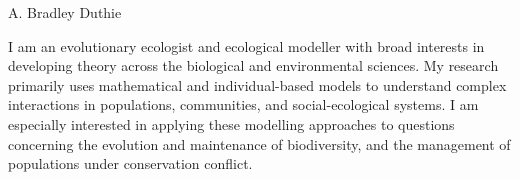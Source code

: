 \documentclass[letterpaper]{article}
\def\name{A. Bradley Duthie}
\begin{document}
\thispagestyle{specialfooter}


{\Huge \name}

\hrulefill

\vspace{0.03in}

I am an evolutionary ecologist and ecological modeller with broad interests in developing theory across the biological and environmental sciences. My research primarily uses mathematical and individual-based models to understand complex interactions in populations, communities, and social-ecological systems. I am especially interested in applying these modelling approaches to questions concerning the evolution and maintenance of biodiversity, and the management of populations under conservation conflict.




\end{document}
